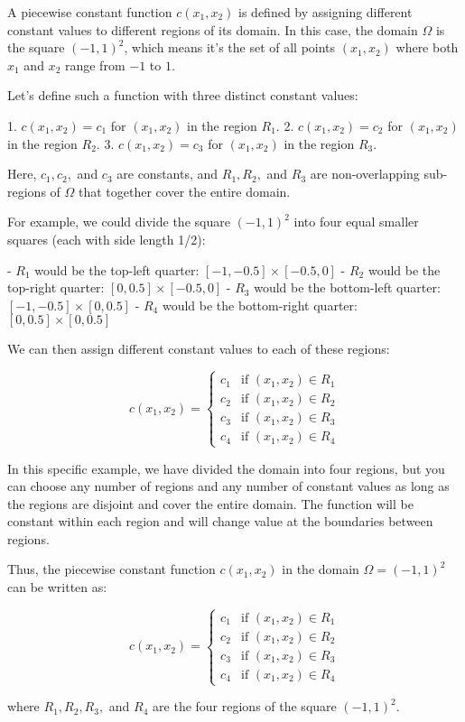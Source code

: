 A piecewise constant function \( c(x_1, x_2) \) is defined by assigning different constant values to different regions of its domain. In this case, the domain \(\Omega\) is the square \((-1,1)^2\), which means it's the set of all points \((x_1, x_2)\) where both \(x_1\) and \(x_2\) range from \(-1\) to \(1\).

Let's define such a function with three distinct constant values:

1. \( c(x_1, x_2) = c_1 \) for \((x_1, x_2)\) in the region \( R_1 \).
2. \( c(x_1, x_2) = c_2 \) for \((x_1, x_2)\) in the region \( R_2 \).
3. \( c(x_1, x_2) = c_3 \) for \((x_1, x_2)\) in the region \( R_3 \).

Here, \( c_1, c_2, \) and \( c_3 \) are constants, and \( R_1, R_2, \) and \( R_3 \) are non-overlapping sub-regions of \(\Omega\) that together cover the entire domain.

For example, we could divide the square \((-1,1)^2\) into four equal smaller squares (each with side length 1/2):

- \( R_1 \) would be the top-left quarter: \([-1, -0.5] \times [-0.5, 0]\)
- \( R_2 \) would be the top-right quarter: \([0, 0.5] \times [-0.5, 0]\)
- \( R_3 \) would be the bottom-left quarter: \([-1, -0.5] \times [0, 0.5]\)
- \( R_4 \) would be the bottom-right quarter: \([0, 0.5] \times [0, 0.5]\)

We can then assign different constant values to each of these regions:

\[ c(x_1, x_2) = 
\begin{cases} 
c_1 & \text{if } (x_1, x_2) \in R_1 \\
c_2 & \text{if } (x_1, x_2) \in R_2 \\
c_3 & \text{if } (x_1, x_2) \in R_3 \\
c_4 & \text{if } (x_1, x_2) \in R_4 
\end{cases}
\]

In this specific example, we have divided the domain into four regions, but you can choose any number of regions and any number of constant values as long as the regions are disjoint and cover the entire domain. The function will be constant within each region and will change value at the boundaries between regions.

Thus, the piecewise constant function \( c(x_1, x_2) \) in the domain \(\Omega = (-1,1)^2\) can be written as:

\[ c(x_1, x_2) = 
\begin{cases} 
c_1 & \text{if } (x_1, x_2) \in R_1 \\
c_2 & \text{if } (x_1, x_2) \in R_2 \\
c_3 & \text{if } (x_1, x_2) \in R_3 \\
c_4 & \text{if } (x_1, x_2) \in R_4 
\end{cases}
\]

where \( R_1, R_2, R_3, \) and \( R_4 \) are the four regions of the square \((-1,1)^2\).